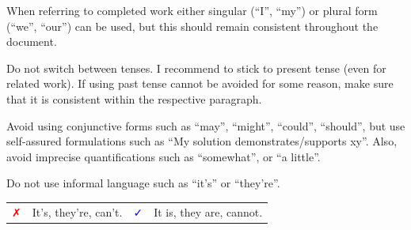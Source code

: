 \documentclass[10pt, a4paper]{article}
\newcommand{\genericbox}[4]{%
\footnotesize
\begin{tcolorbox}[width=.95\textwidth,colback={#1},title={#3},colbacktitle={#2},coltitle=black]
#4
\end{tcolorbox}
\normalsize
}
\newcommand{\examplesbox}[1]{%
\genericbox{blue!10!white}{blue!30!white}{\faHandORight\ Examples}{#1}
}
\newcommand{\exampleFalse}{%
    \textcolor{red}{\faClose}
}
\newcommand{\exampleCorrect}{%
    \textcolor{blue}{\faCheck}
}
\begin{document}
\begin{enumdescript}
\begin{description}
            When referring to completed work either singular (``I'', ``my'') or plural form (``we'', ``our'') can be used, but this should remain consistent throughout the document.
            \item[Tenses]
            Do not switch between tenses. 
            I recommend to stick to present tense (even for related work). 
            If using past tense cannot be avoided for some reason, make sure that it is consistent within the respective paragraph.
            \item[Stringency] Avoid using conjunctive forms such as ``may'', ``might'', ``could'', ``should'', but use self-assured formulations such as ``My solution demonstrates/supports xy''. 
            Also, avoid imprecise quantifications such as ``somewhat'', or ``a little''.
            \item[Informality] Do not use informal language such as ``it's'' or ``they're''.
        \end{description}
    \examplesbox{
       \begin{tabularx}{\textwidth}{p{4mm}@{}X|p{4mm}@{}X}
           \exampleFalse & It's, they're, can't.
           & \exampleCorrect & It is, they are, cannot. \\
       \end{tabularx}
    }    
        

\end{enumdescript}
\end{document}
